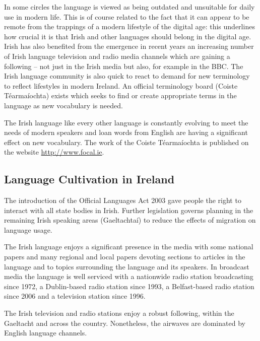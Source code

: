 \begin{multicols}{2}
In some circles the language is viewed as being outdated and unsuitable for daily use in modern life. This is of course related to the fact that it can appear to be remote from the trappings of a modern lifestyle of the digital age: this underlines how crucial it is that Irish and other languages should belong in the digital age. Irish has also benefited from the emergence in recent years an increasing number of Irish language television and radio media channels which are gaining a following -- not just in the Irish media but also, for example in the BBC. The Irish language community is also quick to react to demand for new terminology to reflect lifestyles in modern Ireland. An official terminology board (Coiste Téarmaíochta) exists which seeks to find or create appropriate terms in the language as new vocabulary is needed.


The Irish language like every other language is constantly evolving to meet the needs of modern speakers and loan words from English are having a significant effect on new vocabulary. The work of the Coiste Téarmaíochta is published on the website \url{http://www.focal.ie}.


\subsection{Language Cultivation in Ireland}

The introduction of the Official Languages Act 2003 gave people the right to interact with all state bodies in Irish. Further legislation governs planning in the remaining Irish speaking areas (Gaeltachtaí) to reduce the effects of migration on language usage.

The Irish language enjoys a significant presence in the media with some national papers and many regional and local papers devoting sections to articles in the language and to topics surrounding the language and its speakers. In broadcast media the language is well serviced with a nationwide radio station broadcasting since 1972, a Dublin-based radio station since 1993, a Belfast-based radio station since 2006 and a television station since 1996. 


The Irish television and radio stations enjoy a robust following, within the Gaeltacht and across the country. Nonetheless, the airwaves are dominated by English language channels.



\end{multicols}
